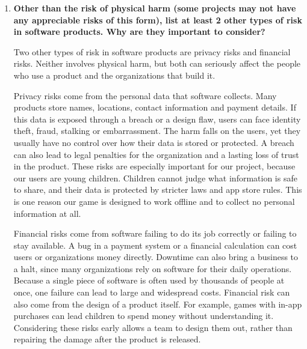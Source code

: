 \documentclass{article}
\newcounter{sr}
\begin{document}
\begin{enumerate}
\begin{longtable}{@{}
        p{0.17\linewidth}
        p{0.32\linewidth}
        p{0.42\linewidth}
    @{}}
    \bottomrule
    \end{longtable}

    The FMEA helped the team move beyond identifying
    general risks and examine specific failures that
    could occur during gameplay. By considering the
    causes and effects of each failure, the team was
    able to develop additional safety and security
    requirements to reduce these risks.

    \item \textbf{Other than the risk of physical harm (some projects may not
    have any appreciable risks of this form), list at least 2 other types of risk
    in software products. Why are they important to consider?}

    Two other types of risk in software products are privacy risks and financial
    risks. Neither involves physical harm, but both can seriously affect the people
    who use a product and the organizations that build it.

    Privacy risks come from the personal data that software collects. Many
    products store names, locations, contact information and payment details. If
    this data is exposed through a breach or a design flaw, users can face
    identity theft, fraud, stalking or embarrassment. The harm falls on the users,
    yet they usually have no control over how their data is stored or protected.
    A breach can also lead to legal penalties for the organization and a lasting
    loss of trust in the product. These risks are especially important for our
    project, because our users are young children. Children cannot judge what
    information is safe to share, and their data is protected by stricter laws and
    app store rules. This is one reason our game is designed to work offline and
    to collect no personal information at all.

    Financial risks come from software failing to do its job correctly or failing
    to stay available. A bug in a payment system or a financial calculation can
    cost users or organizations money directly. Downtime can also bring a business
    to a halt, since many organizations rely on software for their daily
    operations. Because a single piece of software is often used by thousands of
    people at once, one failure can lead to large and widespread costs. Financial
    risk can also come from the design of a product itself. For example, games
    with in-app purchases can lead children to spend money without understanding
    it. Considering these risks early allows a team to design them out, rather
    than repairing the damage after the product is released.
\end{enumerate}

\newpage



\end{document}
